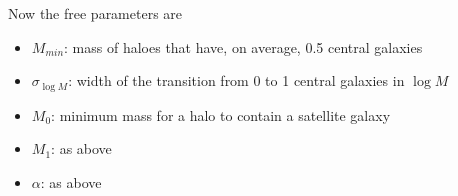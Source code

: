 \documentclass[10pt,a4paper]{article}
\begin{document}
Now the free parameters are
\begin{itemize}
\item $M_{min}$: mass of haloes that have, on average, 0.5 central galaxies
\item $\sigma_{\log M}$: width of the transition from 0 to 1 central galaxies in $\log M$
\item $M_0$: minimum mass for a halo to contain a satellite galaxy
\item $M_1$: as above
\item $\alpha$: as above
\end{itemize}
\end{document}
